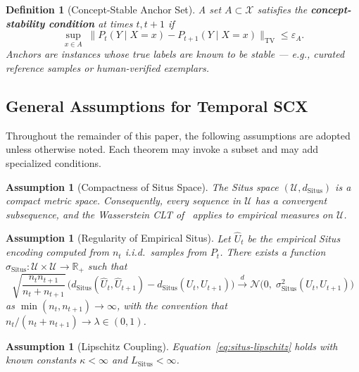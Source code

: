 \documentclass[12pt,a4paper]{article}
\newtheorem{definition}[theorem]{Definition}
\newtheorem{assumption}[theorem]{Assumption}
\newcommand{\R}{\mathbb{R}}
\newcommand{\cX}{\mathcal{X}}
\newcommand{\cU}{\mathcal{U}}
\newcommand{\Situs}{\mathrm{Situs}}
\newcommand{\dto}{\overset{d}{\to}}
\begin{document}
\begin{definition}[Concept-Stable Anchor Set]
\label{def:anchor}
A set $A \subset \cX$ satisfies the \textbf{concept-stability condition} at
times $t, t+1$ if
\begin{equation}\label{eq:anchor-condition}
    \sup_{x \in A}\;
    \|P_t(Y \mid X=x) - P_{t+1}(Y \mid X=x)\|_{\mathrm{TV}}
    \leq \varepsilon_A.
\end{equation}
Anchors are instances whose true labels are known to be stable --- e.g.,
curated reference samples or human-verified exemplars.
\end{definition}

\subsection{General Assumptions for Temporal SCX}
\label{sec:assumptions}

Throughout the remainder of this paper, the following assumptions are
adopted unless otherwise noted.  Each theorem may invoke a subset and
may add specialized conditions.

\begin{assumption}[Compactness of Situs Space]
\label{asmp:situs-compact}
The Situs space $(\cU, d_{\Situs})$ is a compact metric space.
Consequently, every sequence in $\cU$ has a convergent subsequence,
and the Wasserstein CLT of~\citet{sommerfeld2018inference} applies
to empirical measures on $\cU$.
\end{assumption}

\begin{assumption}[Regularity of Empirical Situs]
\label{asmp:empirical-situs}
Let $\widehat{U}_t$ be the empirical Situs encoding computed from
$n_t$ i.i.d.\ samples from $P_t$.  There exists a function
$\sigma_{\Situs} : \cU \times \cU \to \R_+$ such that
\[
\sqrt{\frac{n_t n_{t+1}}{n_t + n_{t+1}}}\,
\bigl(d_{\Situs}(\widehat{U}_t, \widehat{U}_{t+1}) -
      d_{\Situs}(U_t, U_{t+1})\bigr)
\dto \mathcal{N}\bigl(0,\;
      \sigma_{\Situs}^2(U_t, U_{t+1})\bigr)
\]
as $\min(n_t, n_{t+1}) \to \infty$, with the convention that
$n_t/(n_t + n_{t+1}) \to \lambda \in (0,1)$.
\end{assumption}

\begin{assumption}[Lipschitz Coupling]
\label{asmp:lipschitz}
Equation~\eqref{eq:situs-lipschitz} holds with known constants
$\kappa < \infty$ and $L_{\Situs} < \infty$.
\end{assumption}
\end{document}
